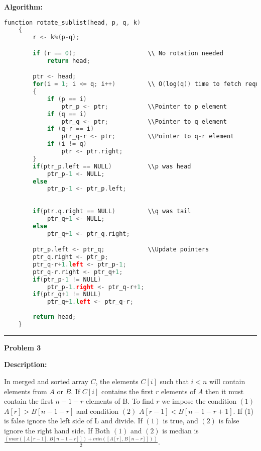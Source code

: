 \documentclass[10pt, a4paper]{article}
\begin{document}
\noindent\textbf{Algorithm:}
\begin{lstlisting}[language=C++,caption=Rotate sublist]
    function rotate_sublist(head, p, q, k)
    {
        r <- k%(p-q);

        if (r == 0);                    \\ No rotation needed
            return head;

        ptr <- head;
        for(i = 1; i <= q; i++)         \\ O(log(q)) time to fetch required pointers
        {  
            if (p == i)
                ptr_p <- ptr;           \\Pointer to p element
            if (q == i)
                ptr_q <- ptr;           \\Pointer to q element
            if (q-r == i)
                ptr_q-r <- ptr;         \\Pointer to q-r element
            if (i != q)
                ptr <- ptr.right;
        }
        if(ptr_p.left == NULL)          \\p was head
            ptr_p-1 <- NULL;
        else
            ptr_p-1 <- ptr_p.left;
    
        
        if(ptr.q.right == NULL)         \\q was tail
            ptr_q+1 <- NULL;
        else
            ptr_q+1 <- ptr_q.right;

        ptr_p.left <- ptr_q;            \\Update pointers
        ptr_q.right <- ptr_p;
        ptr_q-r+1.left <- ptr_p-1;
        ptr_q-r.right <- ptr_q+1;
        if(ptr_p-1 != NULL)
            ptr_p-1.right <- ptr_q-r+1;
        if(ptr_q+1 != NULL)
            ptr_q+1.left <- ptr_q-r;
        
        return head;
    }
\end{lstlisting}

\noindent\rule{\textwidth}{1px}

\newpage
\noindent\large{\textbf{Problem 3}}
\vspace{10pt}

\normalsize

\noindent\textbf{Description:}

In merged and sorted array $C$, the elements $C[i]$ such that $i<n$ will contain elements from $A$ or $B$. If $C[i]$ contains the first $r$ elements of $A$ then it must contain the first $n-1-r$ elements of B. To find $r$ we impose the condition $(1)$ $A[r]>B[n-1-r]$ and condition $(2)$ $A[r-1] < B[n-1-r+1]$. If (1) is false ignore the left side of L and divide. If $(1)$ is true, and $(2)$ is false ignore the right hand side. If Both $(1)$ and $(2)$ is median is $\frac{(max([A[r-1], B[n-1-r]]) + min([A[r], B[n-r]]))}{2}$. 
\end{document}
